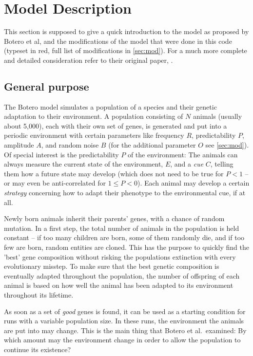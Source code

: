 \documentclass[
12pt, %
a4paper, %
headinclude,footinclude %
]{article}
\newcommand{\modfont}[1]{\begingroup\color{red}#1\endgroup}
\begin{document}
\section{Model Description}
This section is supposed to give a quick introduction to the model as proposed by Botero et al, and the modifications of the model that were done in this code (\modfont{typeset in red}, full list of modifications in \ref{sec:mod}). For a much more complete and detailed consideration refer to their original paper, \cite{botero}.

\subsection{General purpose}
The Botero model simulates a population of a species and their genetic adaptation to their environment. A population consisting of $N$ animals (usually about 5,000), each with their own set of genes, is generated and put into a periodic environment with certain parameters like frequency $R$, predictability $P$, amplitude $A$, and random noise $B$ (for the additional parameter $O$ see \ref{sec:mod}). Of special interest is the predictability $P$ of the environment: The animals can always measure the current state of the environment, $E$, and a \emph{cue} $C$, telling them how a future state may develop (which does not need to be true for $P<1$ -- or may even be anti-correlated for $1 \leq P < 0$). Each animal may develop a certain \emph{strategy} concerning how to adapt their phenotype to the environmental cue, if at all.

Newly born animals inherit their parents' genes, with a chance of random mutation. In a first step, the total number of animals in the population is held constant -- if too many children are born, some of them randomly die, and if too few are born, random entities are cloned. This has the purpose to quickly find the 'best' gene composition without risking the populations extinction with every evolutionary misstep. To make sure that the best genetic composition is eventually adapted throughout the population, the number of offspring of each animal is based on how well the animal has been adapted to its environment throughout its lifetime.

As soon as a set of \emph{good} genes is found, it can be used as a starting condition for runs with a variable population size. In these runs, the environment the animals are put into may change. This is the main thing that Botero et al.~examined: By which amount may the environment change in order to allow the population to continue its existence?
\end{document}
